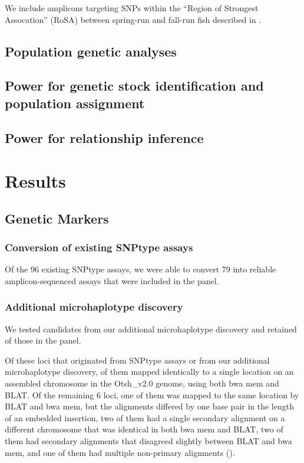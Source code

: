 We include amplicons targeting SNPs within the ``Region of Strongest Assocation'' (RoSA)
between spring-run and fall-run fish described in \citet{thompson2020complex}.

\subsection*{Population genetic analyses}

\subsection*{Power for genetic stock identification and population assignment}

\subsection*{Power for relationship inference}



\section*{Results}

\subsection*{Genetic Markers}

\subsubsection*{Conversion of existing SNPtype assays}

Of the 96 existing SNPtype assays, we were able to convert 79
into reliable amplicon-sequenced assays that were included in the panel.

\subsubsection*{Additional microhaplotype discovery} 

We tested  candidates from our additional microhaplotype discovery and
retained  of those in the panel.

Of these  loci that originated from SNPtype assays or from our additional
microhaplotype discovery,  of them mapped identically to a single
location on an assembled chromosome in the Otsh\_v2.0 genome, using both bwa mem and BLAT.
Of the remaining 6 loci, one of them was mapped to the same location by BLAT and bwa mem, but
the alignments differed by one base pair in the length of an embedded insertion, two of them had a single secondary alignment on a different chromosome
that was identical in both bwa mem and BLAT, two of them had secondary alignments that
disagreed slightly between BLAT and bwa mem, and one of them had multiple
non-primary alignments ().

